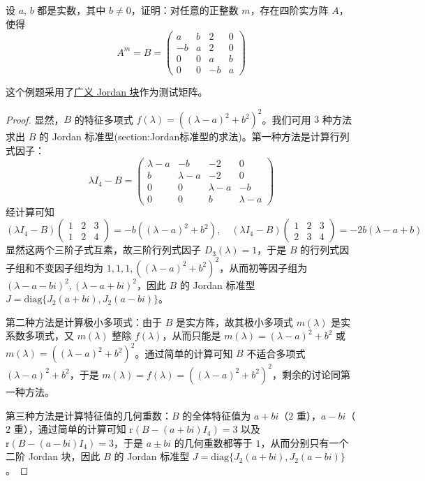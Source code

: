 \documentclass[../../main.tex]{subfiles}%
\begin{document}
\begin{example}
设 $a$, $b$ 都是实数，其中 $b\neq 0$，证明：对任意的正整数 $m$，存在四阶实方阵 $A$，使得
\[
A^m = B = 
\begin{pmatrix}
a & b & 2 & 0 \\
-b & a & 2 & 0 \\
0 & 0 & a & b \\
0 & 0 & -b & a
\end{pmatrix}
\]
\end{example}
\begin{remark}
这个例题采用了\hyperref[theorem:实数域上的广义Jordan标准型]{广义 Jordan 块}作为测试矩阵。
\end{remark}
\begin{proof}
显然，$B$ 的特征多项式 $f(\lambda) = ((\lambda - a)^2 + b^2)^2$。我们可用 $3$ 种方法求出 $B$ 的 Jordan 标准型(section:Jordan标准型的求法)。第一种方法是计算行列式因子：
\[
\lambda I_4 - B = 
\begin{pmatrix}
\lambda - a & -b & -2 & 0 \\
b & \lambda - a & -2 & 0 \\
0 & 0 & \lambda - a & -b \\
0 & 0 & b & \lambda - a
\end{pmatrix}
\]
经计算可知
\[
(\lambda I_4 - B)\begin{pmatrix}1&2&3\\1&2&4\end{pmatrix} = -b((\lambda - a)^2 + b^2), \quad (\lambda I_4 - B)\begin{pmatrix}1&2&3\\2&3&4\end{pmatrix} = -2b(\lambda - a + b)
\]
显然这两个三阶子式互素，故三阶行列式因子 $D_3(\lambda) = 1$，于是 $B$ 的行列式因子组和不变因子组均为 $1,1,1,((\lambda - a)^2 + b^2)^2$，从而初等因子组为 $(\lambda - a - bi)^2,(\lambda - a + bi)^2$，因此 $B$ 的 Jordan 标准型 $J = \mathrm{diag}\{J_2(a + bi),J_2(a - bi)\}$。

第二种方法是计算极小多项式：由于 $B$ 是实方阵，故其极小多项式 $m(\lambda)$ 是实系数多项式，又 $m(\lambda)$ 整除 $f(\lambda)$，从而只能是 $m(\lambda) = (\lambda - a)^2 + b^2$ 或 $m(\lambda) = ((\lambda - a)^2 + b^2)^2$。通过简单的计算可知 $B$ 不适合多项式 $(\lambda - a)^2 + b^2$，于是 $m(\lambda) = f(\lambda) = ((\lambda - a)^2 + b^2)^2$，剩余的讨论同第一种方法。

第三种方法是计算特征值的几何重数：$B$ 的全体特征值为 $a + bi$（$2$ 重），$a - bi$（$2$ 重），通过简单的计算可知 $\mathrm{r}(B - (a + bi)I_4) = 3$ 以及 $\mathrm{r}(B - (a - bi)I_4) = 3$，于是 $a\pm bi$ 的几何重数都等于 $1$，从而分别只有一个二阶 Jordan 块，因此 $B$ 的 Jordan 标准型 $J = \mathrm{diag}\{J_2(a + bi),J_2(a - bi)\}$。


\end{proof}
\end{document}
